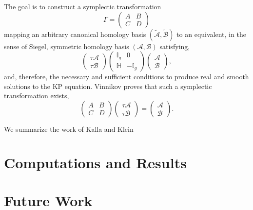 The goal is to construct a symplectic transformation
\begin{equation}
  \Gamma = \begin{pmatrix} A & B \\ C & D \end{pmatrix}
\end{equation}
mapping an arbitrary canonical homology basis $(\tilde{\mathcal{A}},
\tilde{\mathcal{B}})$ to an equivalent, in the sense of Siegel, symmetric
homology basis $(\mathcal{A}, \mathcal{B})$ satisfying,
\begin{equation}
  \begin{pmatrix} \tau \mathcal{A} \\ \tau \mathcal{B} \end{pmatrix}
  \begin{pmatrix}
      \mathbb{I}_g & 0 \\
      \mathbb{H} & -\mathbb{I}_g
  \end{pmatrix}
  \begin{pmatrix} \mathcal{A} \\ \mathcal{B} \end{pmatrix},
\end{equation}
and, therefore, the necessary and sufficient conditions to produce real and
smooth solutions to the KP equation. Vinnikov proves \cite{vinnikov1993self}
that such a symplectic transformation exists,
\begin{equation}
  \begin{pmatrix} A & B \\ C & D \end{pmatrix}
  \begin{pmatrix} \tau{\mathcal{A}} \\ \tau{\mathcal{B}} \end{pmatrix} = 
  \begin{pmatrix} \mathcal{A} \\ \mathcal{B} \end{pmatrix}.
\end{equation}

We summarize the work of Kalla and Klein

\section{Computations and Results}\label{sec:kp-computations-and-results}

\section{Future Work}\label{sec:kp-future-work}
